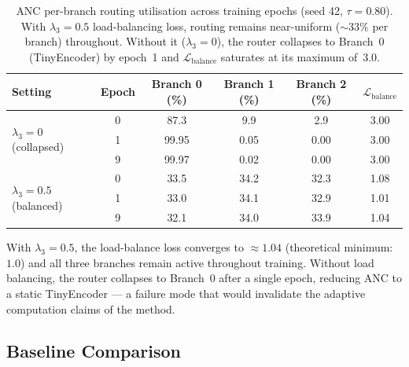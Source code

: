 \documentclass{article}
\begin{document}
\begin{table}[htbp]
\centering
\caption{ANC per-branch routing utilisation across training epochs (seed 42, $\tau{=}0.80$). With $\lambda_3{=}0.5$ load-balancing loss, routing remains near-uniform ($\sim$33\% per branch) throughout. Without it ($\lambda_3{=}0$), the router collapses to Branch~0 (TinyEncoder) by epoch~1 and $\mathcal{L}_{\text{balance}}$ saturates at its maximum of~3.0.}
\label{tab:anc_routing}
\begin{tabular}{lccccc}
\toprule
Setting & Epoch & Branch 0 (\%) & Branch 1 (\%) & Branch 2 (\%) & $\mathcal{L}_{\text{balance}}$ \\
\midrule
\multirow{3}{*}{$\lambda_3=0$ (collapsed)} & 0 & 87.3 & 9.9 & 2.9 & 3.00 \\
 & 1 & 99.95 & 0.05 & 0.00 & 3.00 \\
 & 9 & 99.97 & 0.02 & 0.00 & 3.00 \\
\midrule
\multirow{3}{*}{$\lambda_3=0.5$ (balanced)} & 0 & 33.5 & 34.2 & 32.3 & 1.08 \\
 & 1 & 33.0 & 34.1 & 32.9 & 1.01 \\
 & 9 & 32.1 & 34.0 & 33.9 & 1.04 \\
\bottomrule
\end{tabular}
\end{table}

With $\lambda_3{=}0.5$, the load-balance loss converges to $\approx 1.04$ (theoretical minimum: $1.0$) and all three branches remain active throughout training.
Without load balancing, the router collapses to Branch~0 after a single epoch, reducing ANC to a static TinyEncoder --- a failure mode that would invalidate the adaptive computation claims of the method.

\subsection{Baseline Comparison}
\end{document}
